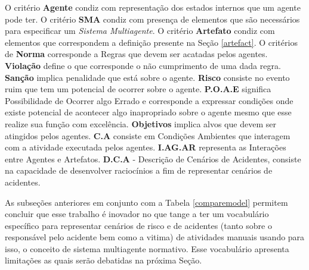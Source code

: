 O critério \textbf{Agente} condiz com representação dos estados internos que um agente pode ter. O critério \textbf{SMA} condiz com presença de elementos que são necessários para especificar um \textit{Sistema Multiagente}. O critério \textbf{Artefato} condiz com elementos que correspondem a definição presente na Seção \ref{artefact}. O critérios de \textbf{Norma} corresponde a Regras que devem ser acatadas pelos agentes. \textbf{Violação} define o que corresponde o não cumprimento de uma dada regra. \textbf{Sanção} implica penalidade que está sobre o agente. \textbf{Risco} consiste no evento ruim que tem um potencial de ocorrer sobre o agente. \textbf{P.O.A.E} significa Possibilidade de Ocorrer algo Errado e corresponde a expressar condições onde existe potencial de acontecer algo inapropriado sobre o agente mesmo que esse realize sua função com excelência.  \textbf{Objetivos} implica alvos que devem ser atingidos pelos agentes. \textbf{C.A} consiste em Condições Ambientes que interagem com a atividade executada pelos agentes. \textbf{I.AG.AR} representa as Interações entre Agentes e Artefatos. \textbf{D.C.A} - Descrição de Cenários de Acidentes, consiste na capacidade de desenvolver raciocínios a fim de representar cenários de acidentes.

As subseções anteriores em conjunto com a Tabela \ref{comparemodel} permitem concluir que esse trabalho é inovador no que tange a ter um vocabulário específico para representar cenários de risco e de acidentes (tanto sobre o responsável pelo acidente bem como a vitima) de atividades manuais usando para isso, o conceito de sistema multiagente normativo. Esse vocabulário apresenta limitações as quais serão debatidas na próxima Seção. 